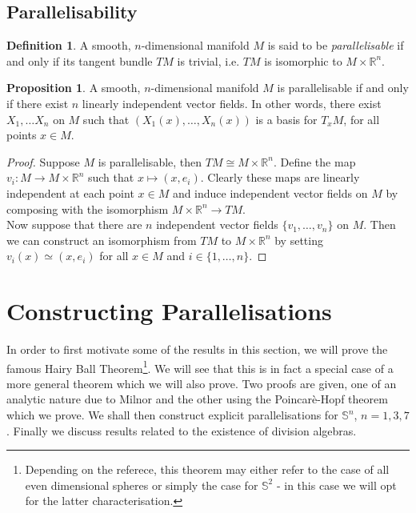 \documentclass[12pt,a4paper]{article}
\numberwithin{equation}{section}
\newtheorem{theorem}{Theorem}[section]
\theoremstyle{definition}
\newtheorem{definition}{Definition}[section]
\newtheorem{proposition}{Proposition}[section]
\theoremstyle{remark}
\begin{document}
\subsection{Parallelisability}
\begin{definition}
A smooth, $n$-dimensional manifold $M$ is said to be \textit{parallelisable} if and only if its tangent bundle $TM$ is trivial, i.e. $TM$ is isomorphic to $M\times\mathbb{R}^n$.
\end{definition}
\begin{proposition}
A smooth, $n$-dimensional manifold $M$ is parallelisable if and only if there exist $n$ linearly independent vector fields. In other words, there exist $X_1,\ldots X_n$ on $M$ such that $\left(X_1(x),\ldots, X_n(x) \right)$ is a basis for $T_xM$, for all points $x\in M$.
\label{prop:para-condn}
\end{proposition}
\begin{proof}
Suppose $M$ is parallelisable, then $TM\cong M\times\mathbb{R}^n$. Define the map $v_i:M\to M\times\mathbb{R}^n$ such that $x\mapsto (x,e_i)$. Clearly these maps are linearly independent at each point $x\in M$ and induce independent vector fields on $M$ by composing with the isomorphism $M\times \mathbb{R}^n\to TM$.\\

Now suppose that there are $n$ independent vector fields $\{v_1,\ldots,v_n\}$ on $M$. Then we can construct an isomorphism from $TM$ to $M\times\mathbb{R}^n$ by setting $v_i(x)\simeq (x,e_i)$ for all $x\in M$ and $i\in\{1,\ldots,n\}$.
\end{proof}
\pagebreak
 \section{Constructing Parallelisations}
In order to first motivate some of the results in this section, we will prove the famous Hairy Ball Theorem\footnote{Depending on the referece, this theorem may either refer to the case of all even dimensional spheres or simply the case for $\mathbb{S}^2$ - in this case we will opt for the latter characterisation.}. We will see that this is in fact a special case of a more general theorem which we will also prove. Two proofs are given, one of an analytic nature due to Milnor \cite{MR505523} and the other using the Poincar\`{e}-Hopf theorem which we prove.
We shall then construct explicit parallelisations for $\mathbb{S}^n$, $n=1,3,7$. Finally we discuss results related to the existence of division algebras.
 
\end{document}
